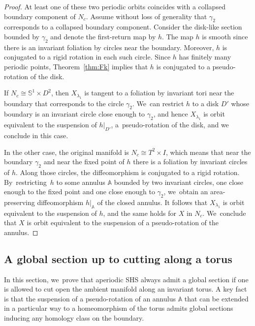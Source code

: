 \documentclass[11pt]{article}
\theoremstyle{definition}
\newcommand{\mS}{\mathbb{S}}
\begin{document}
\begin{proof}
At least one of these two periodic orbits coincides with a collapsed boundary component of $N_c$. Assume without loss of generality that $\gamma_2$ corresponds to a collapsed boundary component. Consider the disk-like section bounded by $\gamma_2$ and denote the first-return map by $h$. The map $h$ is smooth since there is an invariant foliation by circles near the boundary. Moreover, $h$ is conjugated to a rigid rotation in each such circle. Since $h$ has finitely many periodic points, Theorem~\ref{thm:Fk} implies that $h$ is conjugated to a pseudo-rotation of the disk.\enlargethispage{-.5\baselineskip}

If $N_c\cong \mS^1\times D^2$, then $X_{\lambda_1}$ is tangent to a foliation by invariant tori near the boundary that corresponds to the circle $\gamma_2$. We~can restrict $h$ to a disk $D'$ whose boundary is an invariant circle close enough to $\gamma_2$, and hence $X_{\lambda_1}$ is orbit equivalent to the suspension of $h|_{D'}$, a~pseudo-rotation of the disk, and we conclude in this case.

In the other case, the original manifold is $N_c\cong T^2\times I$, which means that near the boundary $\gamma_2$ and near the fixed point of $h$ there is a foliation by invariant circles of $h$. Along those circles, the diffeomorphism is conjugated to a rigid rotation. By~restricting~$h$ to some annulus $\mathbb{A}$ bounded by two invariant circles, one close enough to the fixed point and one close enough to $\gamma_2$, we~obtain an area-preserving diffeomorphism $h|_\mathbb{A}$
of the closed annulus. It follows that $X_{\lambda_1}$ is orbit equivalent to the suspension of $h$, and the same holds for $X$ in $N_c$. We~conclude that $X$ is orbit equivalent to the suspension of a pseudo-rotation of the annulus.
\end{proof}

\subsection{A global section up to cutting along a torus}

In this section, we~prove that aperiodic SHS always admit a global section if one is allowed to cut open the ambient manifold along an invariant torus. A key fact is that the suspension of a pseudo-rotation of an annulus $\mathbb{A}$ that can be extended in a particular way to a homeomorphism of the torus admits global sections inducing any homology class on the boundary.
\end{document}
